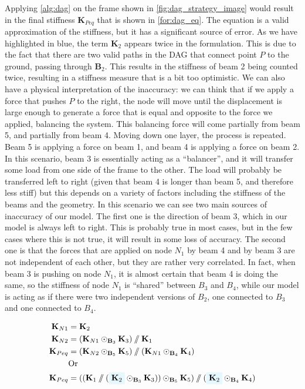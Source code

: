 Applying \cref{alg:dag} on the frame shown in \cref{fig:dag_strategy_image}
would result in the final stiffness $\mathbf{K}_{Peq}$ that is shown in \cref{for:dag_eq}.
The equation is a valid approximation of the stiffness, but it has a significant source of error.
As we have highlighted in blue, the term $\mathbf{K}_2$ appears twice in the formulation.
This is due to the fact that there are two valid paths in the DAG that connect point $P$ to the ground, passing through $\mathbf{B}_2$. This results in the stiffness of beam 2 being counted twice, resulting
in a stiffness measure that is a bit too optimistic.
We can also have a physical interpretation of the inaccuracy: we can think that if we apply a force that
pushes $P$ to the right, the node will move until the displacement is large enough to generate a force
that is equal and opposite to the force we applied, balancing the system.
This balancing force will come partially from beam 5, and partially from beam 4.
Moving down one layer, the process is repeated. Beam 5 is applying a force on beam 1, and beam
4 is applying a force on beam 2. In this scenario, beam 3 is essentially acting as a ``balancer'', and it will transfer some load
from one side of the frame to the other. The load will probably be transferred left to right (given that beam 4
is longer than beam 5, and therefore less stiff) but this depends on a variety of factors including
the stiffness of the beams and the geometry.
In this scenario we can see two main sources of inaccuracy of our model. The first one is the direction of beam 3,
which in our model is always left to right. This is probably true in most cases, but in the few cases where this is not
true, it will result in some loss of accuracy. The second one is that the forces that are applied on node $N_1$ by beam
4 and by beam 3 are not independent of each other, but they are rather very correlated.
In fact, when beam 3 is pushing on node $N_1$, it is almost certain that beam 4 is doing the same,
so the stiffness of node $N_1$ is ``shared'' between $B_3$ and $B_4$, while our model
is acting as if there were two independent versions of $B_2$, one connected to $B_3$ and one connected to
$B_4$.


\begin{equation}
\begin{split}
    \mathbf{K}_{N1} &= \mathbf{K}_2 \\
    \mathbf{K}_{N2} &= (\mathbf{K}_{N1} \stiffseries_{\mathbf{B}_3} \mathbf{K}_3) \stiffparallel \mathbf{K}_1\\
    \mathbf{K}_{Peq} &= (\mathbf{K}_{N2} \stiffseries_{\mathbf{B}_5} \mathbf{K}_{5}) \stiffparallel (\mathbf{K}_{N1} \stiffseries_{\mathbf{B}_4} \mathbf{K}_{4}) \\
    &\text{Or} \\
    \mathbf{K}_{Peq} &= ((\mathbf{K}_{1} \stiffparallel (\colorbox{cyan!10}{$\mathbf{K}_{2}$} \stiffseries_{\mathbf{B}_3} \mathbf{K}_3) ) \stiffseries_{\mathbf{B}_5} \mathbf{K}_{5}) \stiffparallel (\colorbox{cyan!10}{$\mathbf{K}_{2}$} \stiffseries_{\mathbf{B}_4} \mathbf{K}_4)
\end{split}
\label{for:dag_eq}
\end{equation}



